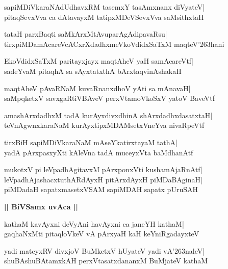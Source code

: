 \documentclass[twoside,12pt,openright]{book}
\def\S{\char'263}
\newcounter{shloka}[chapter]
\def\uvaca#1{\centerline{{\large\textbf{#1}}}}
\begin{document}
\begin{shloka}%
sapiMDiVkaraNAdUdhavxRM tasemxY tasAmxnanx diVyateV|\\
pitaqSevxVva ca dAtavayxM tatipxMDeVSevxVva saMsithxtaH
\end{shloka}

\begin{shloka}%
tataH parxBaqti saMkArxMtAvuparAgAdipavaRsu|\\
tirxpiMDamAcareVcACxrXdadhxmeVkoVdidxSaTxM maqteV\S hani
\end{shloka}

\begin{shloka}%
EkoVdidxSaTxM paritayxjayx maqtAheV yaH samAcareVtf|\\
sadeYvaM pitaqhA sa sAyxtatxthA bArxtaqvinAshakaH
\end{shloka}

\begin{shloka}%
maqtAheV pAvaRNaM kuvaRnanxdhoV yAti sa mAnavaH|\\
saMpqketxV savxgaRtiVBAveV perxVtamoVkoSxV yatoV BaveVtf
\end{shloka}

\begin{shloka}%
amashArxdadhxM tadA kurAyxdivxdhinA shArxdadhxdasatxtaH|\\
teVnAgwnxkaraNaM kurAyxtipxMDAMsetxVneYva nivaRpeVtf
\end{shloka}

\begin{shloka}%
tirxBiH sapiMDiVkaraNaM mAseYkatirxtayaM tathA|\\
yadA pArxpasxyXti kAleVna tadA muceyxVta baMdhanAtf
\end{shloka}

\begin{shloka}%
mukotxV pi leVpadhAgitavxM pArxponxVti kushamAjaRnAtf|\\
leVpadhAjashacxtuthARdAyxH pitArxdAyxH piMDaBAginaH|\\
piMDadaH sapatxmasetxVSAM sapiMDAH sapatx pUruSAH
\end{shloka}

\uvaca{|| BiVSamx uvAca ||}
\begin{shloka}%
kathaM kavAyxni deVyAni havAyxni ca janeYH kathaM|\\
gaqhaNxMti pitaqloVkeV vA pArxyaH kaH keYniRgadayxteV
\end{shloka}

\begin{shloka}%
yadi mateyxRV divxjoV BuMketxV hUyateV yadi vA\S naleV|\\
shuBAshuBAtamxkAH perxVtasatxdananxM BuMjateV kathaM
\end{shloka}
\end{document}
